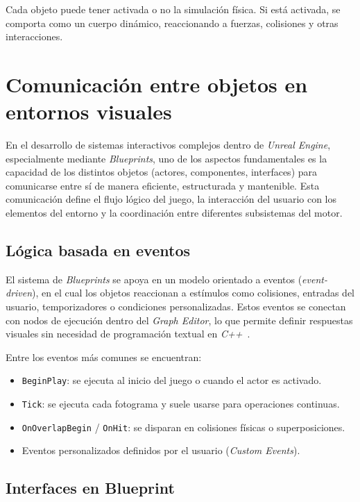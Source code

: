 Cada objeto puede tener activada o no la simulación física. Si está activada, se comporta como un cuerpo dinámico, reaccionando a fuerzas, colisiones y otras interacciones.

\section{Comunicación entre objetos en entornos visuales}

En el desarrollo de sistemas interactivos complejos dentro de \textit{Unreal Engine}, especialmente mediante \textit{Blueprints}, uno de los aspectos fundamentales es la capacidad de los distintos objetos (actores, componentes, interfaces) para comunicarse entre sí de manera eficiente, estructurada y mantenible. Esta comunicación define el flujo lógico del juego, la interacción del usuario con los elementos del entorno y la coordinación entre diferentes subsistemas del motor.

\subsection{Lógica basada en eventos}

El sistema de \textit{Blueprints} se apoya en un modelo orientado a eventos (\textit{event-driven}), en el cual los objetos reaccionan a estímulos como colisiones, entradas del usuario, temporizadores o condiciones personalizadas. Estos eventos se conectan con nodos de ejecución dentro del \textit{Graph Editor}, lo que permite definir respuestas visuales sin necesidad de programación textual en \textit{C++}~\cite{epicblueprintdocs}.

Entre los eventos más comunes se encuentran:
\begin{itemize}
  \item \texttt{BeginPlay}: se ejecuta al inicio del juego o cuando el actor es activado.
  \item \texttt{Tick}: se ejecuta cada fotograma y suele usarse para operaciones continuas.
  \item \texttt{OnOverlapBegin} / \texttt{OnHit}: se disparan en colisiones físicas o superposiciones.
  \item Eventos personalizados definidos por el usuario (\textit{Custom Events}).
\end{itemize}

\subsection{Interfaces en Blueprint}

